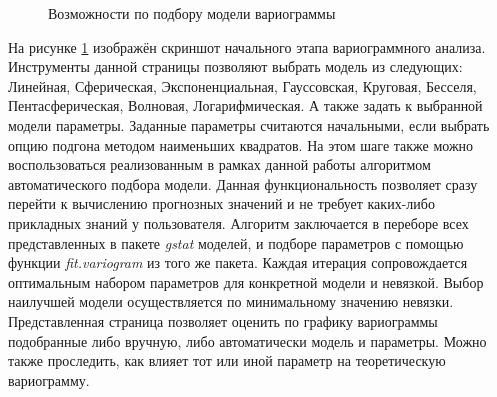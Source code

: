 \begin{figure}[ht]
\caption{Возможности по подбору модели вариограммы}
\label{img:mod_variogram}
\end{figure}
На рисунке \ref{img:mod_variogram} изображён скриншот начального этапа вариограммного анализа. Инструменты данной страницы позволяют выбрать модель из следующих: Линейная, Сферическая, Экспоненциальная, Гауссовская, Круговая, Бесселя, Пентасферическая, Волновая, Логарифмическая. А также задать к выбранной модели параметры. Заданные параметры считаются начальными, если выбрать опцию подгона методом наименьших квадратов. На этом шаге также можно воспользоваться реализованным в рамках данной работы алгоритмом автоматического подбора модели. Данная функциональность позволяет сразу перейти к вычислению прогнозных значений и не требует каких-либо прикладных знаний у пользователя. Алгоритм заключается в переборе всех представленных в пакете \textit{gstat} моделей, и подборе параметров с помощью функции \textit{fit.variogram} из того же пакета. Каждая итерация сопровождается оптимальным набором параметров для конкретной модели и невязкой. Выбор наилучшей модели осуществляется по минимальному значению невязки. Представленная страница позволяет оценить по графику вариограммы подобранные либо вручную, либо автоматически модель и параметры. Можно также проследить, как влияет тот или иной параметр на теоретическую вариограмму.

